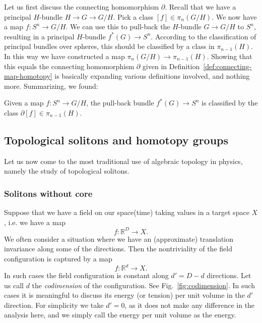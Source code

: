 \documentclass[12pt]{article}
\numberwithin{equation}{section}
\def\bR{\mathbb{R}}
\begin{document}
Let us first discuss the connecting homomorphism $\partial$.
Recall that we have a principal $H$-bundle $H\to G\to G/H$.
Pick a class $[f]\in \pi_{n}(G/H)$.
We now have a map $f:S^{n}\to G/H$.
We can use this to pull-back the $H$-bundle $G\to G/H$ to $S^n$,
resulting in a principal $H$-bundle $f^*(G)\to S^n$.
According to the classification of principal bundles over spheres,
this should be classified by a class in $ \pi_{n-1}(H)$.
In this way we have constructed a map 
$\pi_{n}(G/H)\to \pi_{n-1}(H)$.
Showing that this equals the connecting homomorphism $\partial$
given in Definition~\ref{def:connecting-map-homotopy} 
is basically expanding various definitions involved, and
nothing more.
Summarizing, we found:
\begin{proposition}
\label{prop:connecting-and-bundle}
  Given a map $f:S^{n}\to G/H$,
  the pull-back bundle $f^*(G)\to S^n$ is classified by 
  the class $\partial[f]\in \pi_{n-1}(H)$.
\end{proposition}



\subsection{Topological solitons and homotopy groups}




Let us now come to the most traditional use of algebraic topology in physics, 
namely the study of topological solitons. 

\subsubsection{Solitons without core}
Suppose that we have a field on our space(time) taking values in a target space $X$,
i.e. we have a map \begin{equation}
f:\bR^D \to X.
\end{equation}
We often consider a situation where we have an (approximate) translation invariance along 
some of the directions.
Then the nontriviality of the field configuration is captured by a map 
\begin{equation}
f:\bR^d \to X.
\end{equation}
In such cases the field configuration is constant along $d'=D-d$ directions.
Let us call $d$ the \emph{codimension} of the configuration.
See Fig.~\ref{fig:codimension}.
In such cases it is meaningful to discuss its energy (or tension) per unit volume in the $d'$ direction.
For simplicity we take $d'=0$, as it does not make any difference in the analysis here,
and we simply call the energy per unit volume as the energy.
\end{document}
